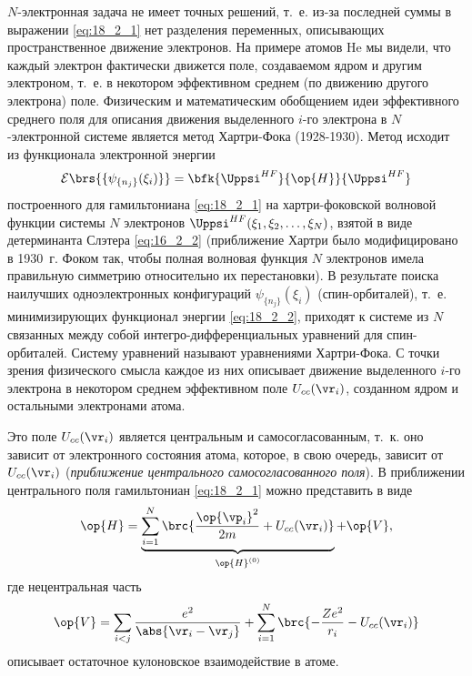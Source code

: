 $N$-электронная задача не имеет точных решений, т.~е. из-за последней суммы в выражении \eqref{eq:18_2_1} нет разделения переменных, описывающих пространственное движение электронов. На примере атомов He мы видели, что каждый электрон фактически движется поле, создаваемом ядром и другим электроном, т.~е. в некотором эффективном среднем (по движению другого электрона) поле. Физическим и математическим обобщением идеи эффективного среднего поля для описания движения выделенного $i$-го электрона в $N$-электронной системе является метод Хартри-Фока\footnotemark{} (1928-1930). Метод исходит из функционала электронной энергии
%
\begin{equation}
\label{eq:18_2_2}
\mathcal{E}\brs{\{\psi_{\{n_j\}}(\xi_i)\}} = \bfk{\Uppsi^{HF}}{\op{H}}{\Uppsi^{HF}}
\end{equation}
построенного для гамильтониана \eqref{eq:18_2_1} на хартри-фоковской волновой функции системы $N$ электронов $\Uppsi^{HF}(\xi_1, \xi_2, \dots, \xi_N)$, взятой в виде детерминанта Слэтера \eqref{eq:16_2_2} (приближение Хартри было модифицировано в 1930~г. Фоком так, чтобы полная волновая функция $N$ электронов имела правильную симметрию относительно их перестановки). В результате поиска наилучших одноэлектронных конфигураций $\psi_{\{n_j\}}(\xi_i)$ (спин-орбиталей), т.~е. минимизирующих функционал энергии \eqref{eq:18_2_2}, приходят к системе из $N$ связанных между собой интегро-дифференциальных уравнений для спин-орбиталей. Систему уравнений называют уравнениями Хартри-Фока. С точки зрения физического смысла каждое из них описывает движение выделенного $i$-го электрона в некотором среднем эффективном поле $U_{cc}(\vr_i)$, созданном ядром и остальными электронами атома. 


Это поле $U_{cc}(\vr_i)$ является центральным и самосогласованным, т.~к. оно зависит от электронного состояния атома, которое, в свою очередь, зависит от $U_{cc}(\vr_i)$ ({\em приближение центрального самосогласованного поля}). В приближении центрального поля гамильтониан \eqref{eq:18_2_1} можно представить в виде
\begin{equation}
\label{eq:18_2_3}
\op{H} = \underbrace{\sum_{i=1}^{N} \brc{\frac{\op{\vp_i}^2}{2m} + U_{cc}(\vr_i)}}_{\op{H}^{(0)}} + \op{V},
\end{equation}
где нецентральная часть
$$
\op{V} = \sum_{i<j} \frac{e^2}{\abs{\vr_i - \vr_j}} + \sum_{i=1}^N \brc{-\frac{Ze^2}{r_i} - U_{cc}(\vr_i)}
$$
описывает остаточное кулоновское взаимодействие в атоме.

